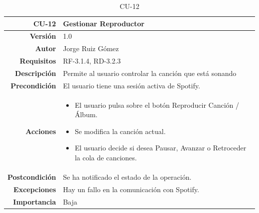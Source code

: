 \begin{table}[H]
    \centering
    \begin{tabular}{r|p{}}
    \hline
    \textbf{CU-12}  & \textbf{Gestionar Reproductor}                                 \\ \hline
    \textbf{Versión}       & 1.0                                                     \\
    \textbf{Autor}         & Jorge Ruiz Gómez                                        \\
    \textbf{Requisitos}    & RF-3.1.4, RD-3.2.3                                        \\
    \textbf{Descripción}   & Permite al usuario controlar la canción que está sonando \\ \hline
    \textbf{Precondición}  & El usuario tiene una sesión activa de Spotify.\\
    \textbf{Acciones}      &    \begin{itemize}
                                    \item El usuario pulsa sobre el botón Reproducir Canción / Álbum.
                                    \item Se modifica la canción actual.
                                    \item El usuario decide si desea Pausar, Avanzar o Retroceder la cola de canciones.
                                \end{itemize}\\
                                                                              
    \textbf{Postcondición} & Se ha notificado el estado de la operación. \\
    \textbf{Excepciones}   & Hay un fallo en la comunicación con Spotify.                                                 \\
    \textbf{Importancia}   & Baja                                                    \\ \hline
    \end{tabular}
    \caption{CU-12}
    \label{tab:CUT-12}
\end{table}


